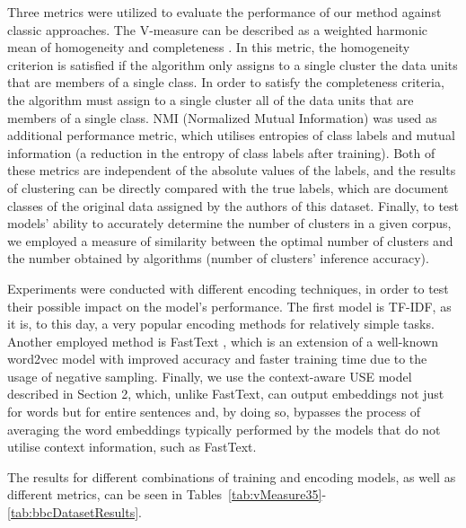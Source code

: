 Three metrics were utilized to evaluate the performance of our method against classic approaches. The V-measure can be described as a weighted harmonic mean of homogeneity and completeness \cite{RosenbergHirschberg}. In this metric, the homogeneity criterion is satisfied if the algorithm only assigns to a single cluster the data units that are members of a single class. In order to satisfy the completeness criteria, the algorithm must assign to a single cluster all of the data units that are members of a single class. NMI (Normalized Mutual Information) \cite{StrehlGhosh} was used as additional performance metric, which utilises entropies of class labels and mutual information (a reduction in the entropy of class labels after training). Both of these metrics are independent of the absolute values of the labels, and the results of clustering can be directly compared with the true labels, which are document classes of the original data assigned by the authors of this dataset. Finally, to test models’ ability to accurately determine the number of clusters in a given corpus, we employed a measure of similarity between the optimal number of clusters and the number obtained by algorithms (number of clusters’ inference accuracy).

Experiments were conducted with different encoding techniques, in order to test their possible impact on the model’s performance. The first model is TF-IDF, as it is, to this day, a very popular encoding methods for relatively simple tasks. Another employed method is FastText \cite{BojanowskiGraveJoulin}, which is an extension of a well-known word2vec model with improved accuracy and faster training time due to the usage of negative sampling. Finally, we use the context-aware USE model described in Section 2, which, unlike FastText, can output embeddings not just for words but for entire sentences and, by doing so, bypasses the process of averaging the word embeddings typically performed by the models that do not utilise context information, such as FastText.

The results for different combinations of training and encoding models, as well as different metrics, can be seen in Tables~\cref{tab:vMeasure35}-\cref{tab:bbcDatasetResults}.

